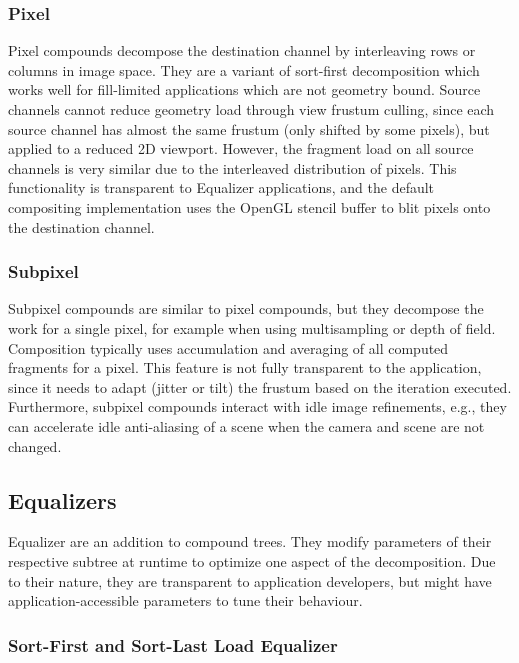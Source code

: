 \documentclass[journal]{vgtc}                %
\begin{document}
\subsubsection{Pixel}

Pixel compounds decompose the destination channel by interleaving rows or
columns in image space. They are a variant of sort-first decomposition which
works well for fill-limited applications which are not geometry bound. Source
channels cannot reduce geometry load through view frustum culling, since each
source channel has almost the same frustum (only shifted by some pixels),
but applied to a reduced 2D viewport. However, the fragment load on all source
channels is very similar due to the interleaved distribution of pixels. This
functionality is transparent to Equalizer applications, and the default
compositing implementation uses the OpenGL stencil buffer to blit pixels onto
the destination channel.

\subsubsection{Subpixel}

Subpixel compounds are similar to pixel compounds, but they decompose the work
for a single pixel, for example when using multisampling or depth of
field. Composition typically uses accumulation and averaging of all computed
fragments for a pixel. This feature is not fully transparent to the application,
since it needs to adapt (jitter or tilt) the frustum based on the iteration
executed. Furthermore, subpixel compounds interact with idle image refinements,
e.g., they can accelerate idle anti-aliasing of a scene when the camera and
scene are not changed.

\subsection{Equalizers}

Equalizer are an addition to compound trees. They modify parameters of their
respective subtree at runtime to optimize one aspect of the decomposition. Due
to their nature, they are transparent to application developers, but might have
application-accessible parameters to tune their behaviour.

\subsubsection{Sort-First and Sort-Last Load Equalizer}
\end{document}
